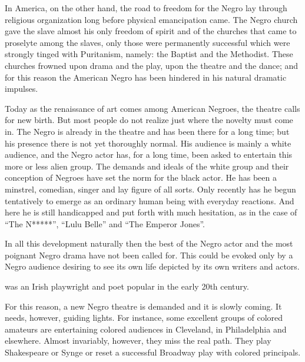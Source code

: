 \documentclass[letterpaper,10pt,english]{jupyterBook}
\begin{document}
\sphinxAtStartPar
In America, on the other hand, the road to freedom for the Negro lay through religious organization long before physical emancipation came. The Negro church gave the slave almost his only freedom of spirit and of the churches that came to proselyte among the slaves, only those were permanently successful which were strongly tinged with Puritanism, namely: the Baptist and the Methodist. These churches frowned upon drama and the play, upon the theatre and the dance; and for this reason the American Negro has been hindered in his natural dramatic impulses.

\sphinxAtStartPar
Today as the renaissance of art comes among American Negroes, the theatre calls for new birth. But most people do not realize just where the novelty must come in. The Negro is already in the theatre and has been there for a long time; but his presence there is not yet thoroughly normal. His audience is mainly a white audience, and the Negro actor has, for a long time, been asked to entertain this more or less alien group. The demands and ideals of the white group and their conception of Negroes have set the norm for the black actor. He has been a minstrel, comedian, singer and lay figure of all sorts. Only recently has he begun tentatively to emerge as an ordinary human being with everyday reactions. And here he is still handicapped and put forth with much hesitation, as in the case of “The N*****”, “Lulu Belle” and “The Emperor Jones”.

\sphinxAtStartPar
In all this development naturally then the best of the Negro actor and the most poignant Negro drama have not been called for. This could be evoked only by a Negro audience desiring to see its own life depicted by its own writers and actors.

\begin{sphinxShadowBox}
\sphinxstylesidebartitle{}

\sphinxAtStartPar
{} was an Irish playwright and poet popular in the early 20th century.
\end{sphinxShadowBox}

\sphinxAtStartPar
For this reason, a new Negro theatre is demanded and it is slowly coming. It needs, however, guiding lights. For instance, some excellent groups of colored amateurs are entertaining colored audiences in Cleveland, in Philadelphia and elsewhere. Almost invariably, however, they miss the real path. They play Shakespeare or Synge or reset a successful Broadway play with colored principals.
\end{document}
